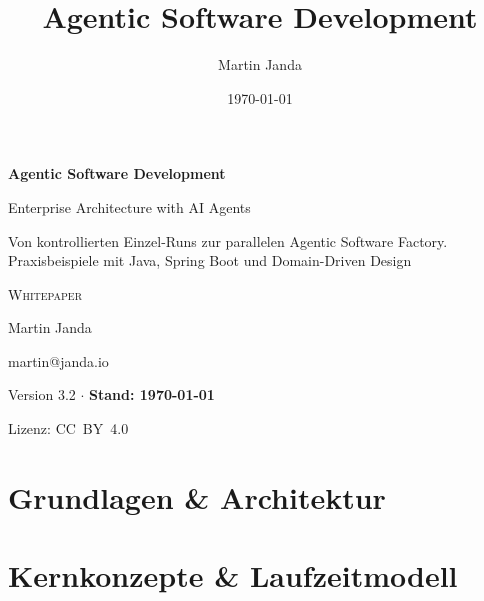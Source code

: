 \documentclass[11pt,a4paper,ngerman]{scrreprt}
\title{Agentic Software Development}
\author{Martin Janda}
\date{\today}
\begin{document}
\begin{titlepage}
  \centering
  \vspace*{2.5cm}

  {\LARGE\bfseries Agentic Software Development\par}
  \vspace{0.4cm}
  {\Large Enterprise Architecture with AI Agents\par}

  \vspace{0.8cm}
  {\large Von kontrollierten Einzel-Runs zur parallelen Agentic Software
  Factory. Praxisbeispiele mit Java, Spring Boot und Domain-Driven
  Design\par}

  \vspace{1.6cm}
  {\large\scshape Whitepaper\par}

  \vspace{1.6cm}
  {\large Martin Janda\par}
  \vspace{0.2cm}
  {\normalsize martin@janda.io\par}

  \vfill
  {\small Version 3.2 $\cdot$ \textbf{Stand: \today}\par}
  \vspace{0.4cm}
  {\small Lizenz: CC~BY~4.0\par}
  \vspace*{1.2cm}
\end{titlepage}

\tableofcontents

\listoffigures



\part{Grundlagen \& Architektur}






\part{Kernkonzepte \& Laufzeitmodell}





\end{document}
